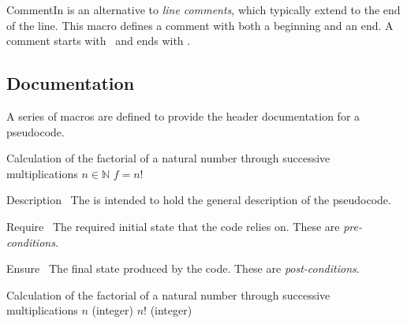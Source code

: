 \documentclass[a4paper, 11pt]{article}
\begin{document}
\begin{Macrodef}{CommentIn}{}{}
     is an alternative to \textit{line comments}, which typically extend to the end of the line. This macro defines a comment with both a beginning and an end. A comment starts with \CommentSymbol\ and ends with \CommentSymbolRight.

    \MacroOptionsText
\end{Macrodef}


\begin{PDExample}
    \begin{algorithmic}
        \EndIf
    \end{algorithmic}
\end{PDExample}

\subsection{Documentation}\label{sec:documentation}
A series of macros are defined to provide the header documentation for a pseudocode.

\begin{PDExample}
    \begin{algorithmic}
        \Description Calculation of the factorial of a natural number through successive multiplications
        \Require $n \in \mathbb{N}$
        \Ensure $f = n!$
    \end{algorithmic}
\end{PDExample}

\begin{Macrodef}{Description}{~}{}
    The  is intended to hold the general description of the pseudocode.
\end{Macrodef}

\begin{Macrodef}{Require}{~}{}
    The required initial state that the code relies on. These are \textit{pre-conditions}.
\end{Macrodef}

\begin{Macrodef}{Ensure}{~}{}
    The final state produced by the code. These are \textit{post-conditions}.
\end{Macrodef}

\begin{PDExample}
    \begin{algorithmic}
        \Description Calculation of the factorial of a natural number through successive multiplications
        \Input $n$ (integer)
        \Output $n!$ (integer)
    \end{algorithmic}
\end{PDExample}
\end{document}

